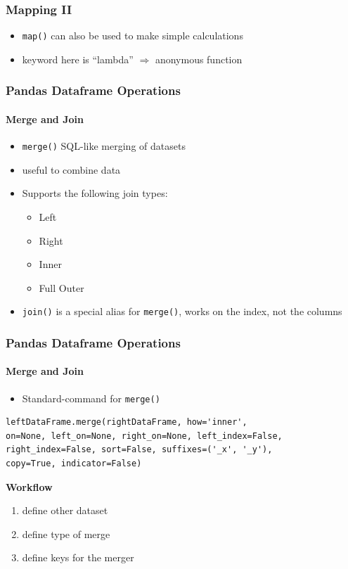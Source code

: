 \documentclass[english]{beamer}
\begin{document}
\begin{frame}[fragile]
\frametitle{Mapping II}

\begin{itemize}
	\item \texttt{map()} can also be used to make simple calculations
	\item keyword here is \enquote{lambda} $\Rightarrow$ anonymous function	
\end{itemize}



\end{frame}

\begin{frame}[fragile]
\frametitle{Pandas Dataframe Operations}
\framesubtitle{Merge and Join}

\begin{itemize}
\item \texttt{merge()} SQL-like merging of datasets
\item useful to combine data
\item Supports the following join types:
\begin{itemize}
	\item Left
	\item Right
	\item Inner
	\item Full Outer
\end{itemize}
\item \texttt{join()} is a special alias for \texttt{merge()},  works on \newline the index, not the columns
\end{itemize}

\end{frame}

\begin{frame}[fragile]
\frametitle{Pandas Dataframe Operations}
\framesubtitle{Merge and Join}

\begin{itemize}
	\item Standard-command for \texttt{merge()}
\end{itemize}

\begin{lstlisting}
leftDataFrame.merge(rightDataFrame, how='inner', 
on=None, left_on=None, right_on=None, left_index=False, 
right_index=False, sort=False, suffixes=('_x', '_y'), 
copy=True, indicator=False)
\end{lstlisting}

\textbf{Workflow}

\begin{enumerate}
\item define other dataset
\item define type of merge
\item define keys for the merger
\end{enumerate}

\end{frame}
\end{document}
